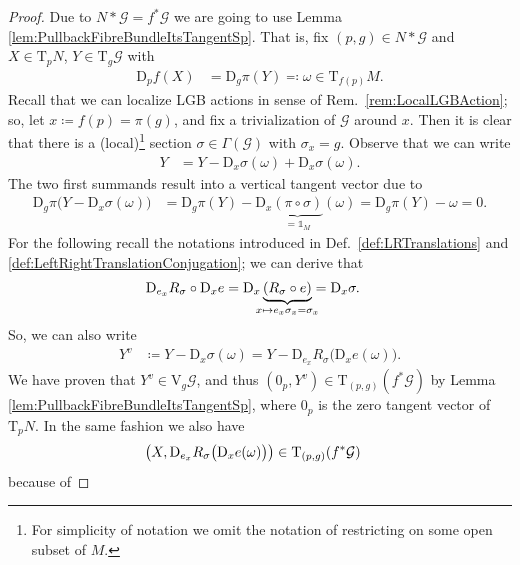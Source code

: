 \documentclass[reqno,a4paper,oneside]{amsart}
\theoremstyle{plain}
\theoremstyle{remark}
\theoremstyle{definition}
\begin{document}
\begin{proof}
Due to $N*\mathcal{G} = f^*\mathcal{G}$ we are going to use Lemma \ref{lem:PullbackFibreBundleItsTangentSp}. That is, fix $(p, g) \in N*\mathcal{G}$ and $X \in \mathrm{T}_pN$, $Y \in \mathrm{T}_g \mathcal{G}$ with
\begin{align*}
\mathrm{D}_p f(X) &= \mathrm{D}_g\pi(Y) \eqqcolon \omega \in \mathrm{T}_{f(p)}M.
\end{align*}
Recall that we can localize LGB actions in sense of Rem.\ \ref{rem:LocalLGBAction}; so, let $x \coloneqq f(p) = \pi(g)$, and fix a trivialization of $\mathcal{G}$ around $x$. Then it is clear that there is a (local)\footnote{For simplicity of notation we omit the notation of restricting on some open subset of $M$.} section $\sigma \in \Gamma(\mathcal{G})$ with $\sigma_x = g$. Observe that we can write
\begin{align*}
Y
&=
Y 
	- \mathrm{D}_x \sigma (\omega)
	+ \mathrm{D}_x \sigma (\omega).
\end{align*}
The two first summands result into a vertical tangent vector due to
\begin{align*}
\mathrm{D}_g\pi\bigl( Y - \mathrm{D}_x\sigma(\omega) \bigr)
&=
\mathrm{D}_g\pi( Y ) - \mathrm{D}_x\underbrace{(\pi \circ \sigma)}_{= \mathds{1}_M}(\omega)
=
\mathrm{D}_g \pi (Y) - \omega
=
0.
\end{align*}
For the following recall the notations introduced in Def.\ \ref{def:LRTranslations} and \ref{def:LeftRightTranslationConjugation}; we can derive that
\begin{align*}
\mathrm{D}_{e_x}R_\sigma \circ \mathrm{D}_x e
&=
\mathrm{D}_x \underbrace{\mleft( R_\sigma \circ e \mright)}
	_{\mathclap{x \mapsto e_x \sigma_x = \sigma_x}}
=
\mathrm{D}_x \sigma.
\end{align*}
So, we can also write 
\begin{align*}
Y^v
&\coloneqq
Y - \mathrm{D}_x \sigma(\omega)
=
Y - \mathrm{D}_{e_x}R_\sigma \bigl( \mathrm{D}_x e (\omega) \bigr).
\end{align*}
We have proven that $Y^v \in \mathrm{V}_g\mathcal{G}$, and thus $(0_p, Y^v) \in \mathrm{T}_{(p, g)}(f^*\mathcal{G})$ by Lemma \ref{lem:PullbackFibreBundleItsTangentSp}, where $0_p$ is the zero tangent vector of $\mathrm{T}_pN$. In the same fashion we also have
\begin{align*}
\mleft(X, \mathrm{D}_{e_x}R_\sigma \bigl( \mathrm{D}_x e (\omega) \bigr) \mright)
&\in \mathrm{T}_{(p, g)}(f^*\mathcal{G})
\end{align*}
because of

\end{proof}
\end{document}

